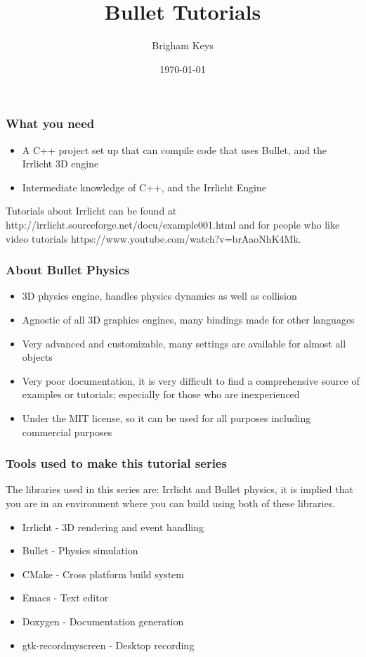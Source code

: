 \documentclass{beamer}
\title[Bullet Tutorials]{Bullet Tutorials} %
\author{Brigham Keys} %
\institute[Collective Tyranny] %
{
Collective Tyranny
\medskip
\textit{bkeys@bkeys.org} %
}
\date{\today} %
\begin{document}
\begin{frame}
\titlepage %
\end{frame}



\begin{frame}
\frametitle{What you need}
\begin{itemize}
\item A C++ project set up that can compile code that uses Bullet, and the Irrlicht 3D engine
\item Intermediate knowledge of C++, and the Irrlicht Engine
\end{itemize}
Tutorials about Irrlicht can be found at http://irrlicht.sourceforge.net/docu/example001.html and for people who like video tutorials https://www.youtube.com/watch?v=brAaoNhK4Mk.
\end{frame}


\begin{frame}
\frametitle{About Bullet Physics}
\begin{itemize}
\item 3D physics engine, handles physics dynamics as well as collision
\item Agnostic of all 3D graphics engines, many bindings made for other languages
\item Very advanced and customizable, many settings are available for almost all objects
\item Very poor documentation, it is very difficult to find a comprehensive source of examples or tutorials; especially for those who are inexperienced
\item Under the MIT license, so it can be used for all purposes including commercial purposes
\end{itemize}
\end{frame}


\begin{frame}
\frametitle{Tools used to make this tutorial series}
The libraries used in this series are: Irrlicht and Bullet physics, it is implied that you are in an environment where you can build using both of these libraries.
\begin{itemize}
\item Irrlicht - 3D rendering and event handling
\item Bullet - Physics simulation
\item CMake - Cross platform build system
\item Emacs - Text editor
\item Doxygen - Documentation generation
\item gtk-recordmyscreen - Desktop recording
\end{itemize}
\end{frame}

\end{document}

